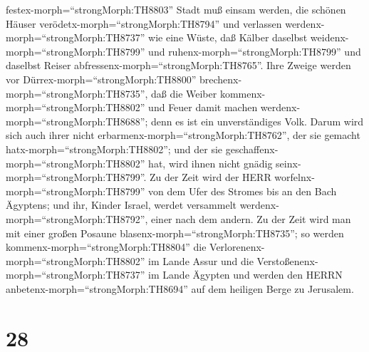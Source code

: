 festex-morph=``strongMorph:TH8803'' Stadt muß einsam werden, die schönen
Häuser verödetx-morph=``strongMorph:TH8794'' und verlassen
werdenx-morph=``strongMorph:TH8737'' wie eine Wüste, daß Kälber daselbst
weidenx-morph=``strongMorph:TH8799'' und
ruhenx-morph=``strongMorph:TH8799'' und daselbst Reiser
abfressenx-morph=``strongMorph:TH8765''.  Ihre Zweige
werden vor Dürrex-morph=``strongMorph:TH8800''
brechenx-morph=``strongMorph:TH8735'', daß die Weiber
kommenx-morph=``strongMorph:TH8802'' und Feuer damit machen
werdenx-morph=``strongMorph:TH8688''; denn es ist ein unverständiges
Volk. Darum wird sich auch ihrer nicht
erbarmenx-morph=``strongMorph:TH8762'', der sie gemacht
hatx-morph=``strongMorph:TH8802''; und der sie
geschaffenx-morph=``strongMorph:TH8802'' hat, wird ihnen nicht gnädig
seinx-morph=``strongMorph:TH8799''.  Zu der Zeit wird der
HERR worfelnx-morph=``strongMorph:TH8799'' von dem Ufer des Stromes bis
an den Bach Ägyptens; und ihr, Kinder Israel, werdet versammelt
werdenx-morph=``strongMorph:TH8792'', einer nach dem andern.
 Zu der Zeit wird man mit einer großen Posaune
blasenx-morph=``strongMorph:TH8735''; so werden
kommenx-morph=``strongMorph:TH8804'' die
Verlorenenx-morph=``strongMorph:TH8802'' im Lande Assur und die
Verstoßenenx-morph=``strongMorph:TH8737'' im Lande Ägypten und werden
den HERRN anbetenx-morph=``strongMorph:TH8694'' auf dem heiligen Berge
zu Jerusalem.

\hypertarget{section-27}{%
\section{28}\label{section-27}}

